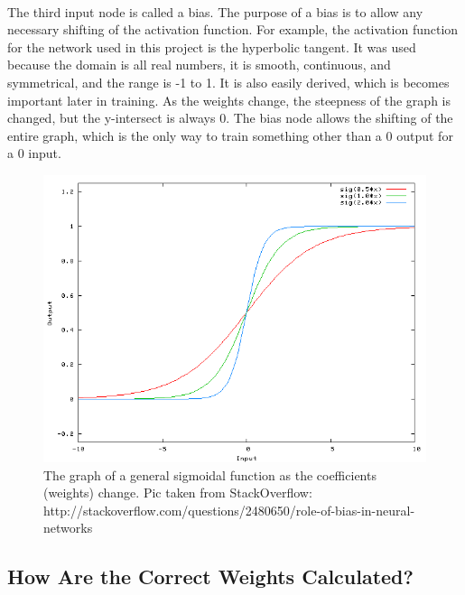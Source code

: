 \documentclass{article}
\begin{document}
    \paragraph{}The third input node is called a bias. The purpose of a bias is to allow
    any necessary shifting of the activation function. For example, the activation function
    for the network used in this project is the hyperbolic tangent. It was used because the
    domain is all real numbers, it is smooth, continuous, and symmetrical, and the range
    is -1 to 1. It is also easily derived, which is becomes important later in training. As
    the weights change, the steepness of the graph is changed, but the y-intersect is always
    0. The bias node allows the shifting of the entire graph, which is the only way to train
    something other than a 0 output for a 0 input.
    \begin{figure}
        \centering
        \includegraphics[scale=0.4]{images/bias.png}
        \caption{The graph of a general sigmoidal function as the coefficients (weights)
            change. Pic taken from StackOverflow: http://stackoverflow.com/questions/2480650/role-of-bias-in-neural-networks}
    \end{figure}
\subsection{How Are the Correct Weights Calculated?}
\end{document}
